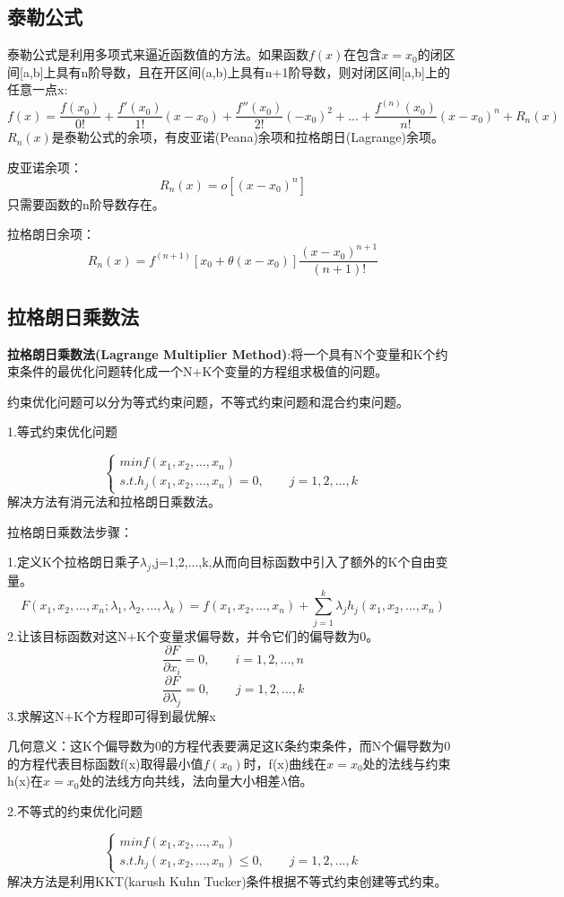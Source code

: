 \documentclass[openbib]{article}
\begin{document}
\subsection{泰勒公式}
泰勒公式是利用多项式来逼近函数值的方法。如果函数$f(x)$在包含$x=x_0$的闭区间[a,b]上具有n阶导数，且在开区间(a,b)上具有n+1阶导数，则对闭区间[a,b]上的任意一点x:
$$f(x)=\frac{f(x_0)}{0!}+\frac{f'(x_0)}{1!}(x-x_0)+\frac{f''(x_0)}{2!}(-x_0)^2+...+\frac{f^{(n)}(x_0)}{n!}(x-x_0)^n+R_n(x)$$
$R_n(x)$是泰勒公式的余项，有皮亚诺(Peana)余项和拉格朗日(Lagrange)余项。

皮亚诺余项：$$R_n(x)=o[(x-x_0)^n]$$
只需要函数的n阶导数存在。

拉格朗日余项：$$R_n(x)=f^{(n+1)}[x_0+\theta(x-x_0)]\frac{(x-x_0)^{n+1}}{(n+1)!}$$
\subsection{拉格朗日乘数法}
\textbf{拉格朗日乘数法(Lagrange Multiplier Method)}:将一个具有N个变量和K个约束条件的最优化问题转化成一个N+K个变量的方程组求极值的问题。

约束优化问题可以分为等式约束问题，不等式约束问题和混合约束问题。
\begin{center}
	1.等式约束优化问题
\end{center}
$$\left\{ \begin{array}{cl}
	minf(x_1,x_2,...,x_n)\\
	s.t.h_j(x_1,x_2,...,x_n)=0,\qquad j=1,2,...,k
\end{array} \right.$$
解决方法有消元法和拉格朗日乘数法。

拉格朗日乘数法步骤：

1.定义K个拉格朗日乘子$\lambda_j$,j=1,2,...,k,从而向目标函数中引入了额外的K个自由变量。
$$F(x_1,x_2,...,x_n;\lambda_1,\lambda_2,...,\lambda_k)=f(x_1,x_2,...,x_n)+\sum_{j=1}^{k}\lambda_j h_j(x_1,x_2,...,x_n)$$
2.让该目标函数对这N+K个变量求偏导数，并令它们的偏导数为0。
$$\frac{\partial F}{\partial x_i}=0,\qquad i=1,2,...,n$$
$$\frac{\partial F}{\partial \lambda_j}=0,\qquad j=1,2,...,k$$
3.求解这N+K个方程即可得到最优解x

几何意义：这K个偏导数为0的方程代表要满足这K条约束条件，而N个偏导数为0的方程代表目标函数f(x)取得最小值$f(x_0)$时，f(x)曲线在$x=x_0$处的法线与约束h(x)在$x=x_0$处的法线方向共线，法向量大小相差$\lambda$倍。
\begin{center}
	2.不等式的约束优化问题
\end{center}
$$\left\{ \begin{array}{cl}
	minf(x_1,x_2,...,x_n)\\
	s.t.h_j(x_1,x_2,...,x_n)\le 0,\qquad j=1,2,...,k
\end{array} \right.$$
解决方法是利用KKT(karush Kuhn Tucker)条件根据不等式约束创建等式约束。
\end{document}
